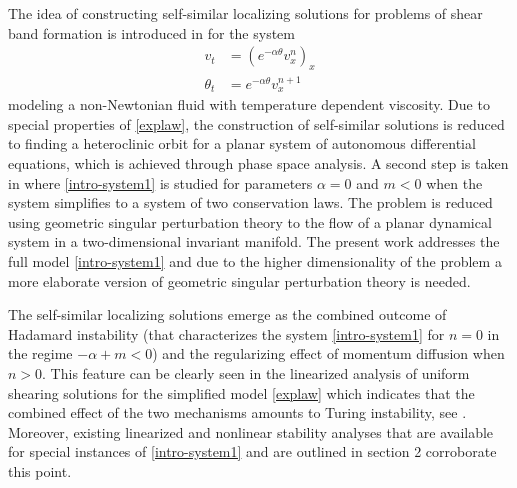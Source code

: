\documentclass[11pt]{article}
\newcommand{\tcb}{}
\theoremstyle{remark}
\begin{document}
The idea of constructing self-similar localizing solutions for problems of shear band formation is introduced in \cite{KOT14} for the system
\begin{equation}
\label{explaw}
\begin{aligned}
v_t &=  ( e^{-\alpha \theta} v_x^n )_x
\\
\theta_t &= e^{-\alpha \theta} v_x^{n+1}
\end{aligned}
\end{equation}
modeling a non-Newtonian fluid with temperature dependent viscosity.
Due to special properties of \eqref{explaw}, \tcb{ the construction of self-similar solutions is reduced to finding a heteroclinic orbit
for a planar system of autonomous differential equations, which is achieved through phase space analysis.} A second step is taken in \cite{LT16}
where \eqref{intro-system1} is studied for parameters $\alpha = 0$ and $m < 0$ when the system simplifies to a system of two conservation laws. The problem is reduced
using geometric singular perturbation theory to the flow of a planar dynamical system in a two-dimensional invariant manifold. The present work addresses
the full model  \eqref{intro-system1} and due to the higher dimensionality of the problem a more elaborate version of geometric singular perturbation theory is needed.

The self-similar localizing solutions emerge as the combined outcome of Hadamard instability (that characterizes the system \eqref{intro-system1} for $n=0$ in the regime
$-\alpha + m < 0$) and the regularizing effect of momentum diffusion when $n > 0$.
This feature can be clearly seen in the linearized analysis of uniform shearing solutions for the simplified model \eqref{explaw} which indicates that the
combined effect of the two mechanisms amounts to Turing instability, see \cite{KOT14}. Moreover, existing linearized and nonlinear stability analyses that are available
for special instances of \eqref{intro-system1} and are outlined in section 2 corroborate this point.
\end{document}
